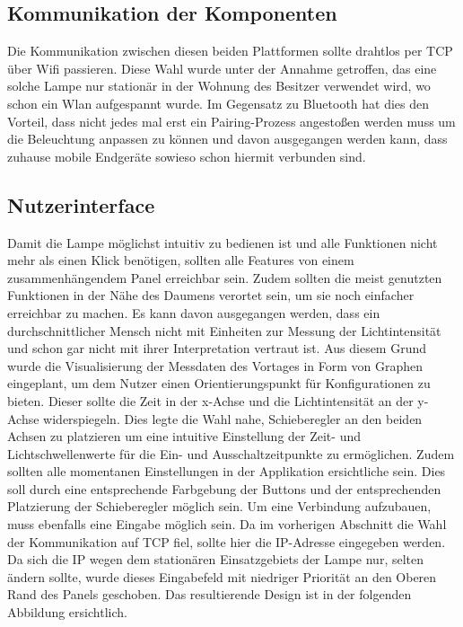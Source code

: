 \subsection{Kommunikation der Komponenten}
Die Kommunikation zwischen diesen beiden Plattformen sollte drahtlos per TCP über Wifi passieren. Diese Wahl wurde unter der Annahme getroffen, das eine solche Lampe nur stationär in der Wohnung des Besitzer verwendet wird, wo schon ein Wlan aufgespannt wurde. Im Gegensatz zu Bluetooth hat dies den Vorteil, dass nicht jedes mal erst ein Pairing-Prozess angestoßen werden muss um die Beleuchtung anpassen zu können und davon ausgegangen werden kann, dass zuhause mobile Endgeräte sowieso schon hiermit verbunden sind.

\subsection{Nutzerinterface}
Damit die Lampe möglichst intuitiv zu bedienen ist und alle Funktionen nicht mehr als einen Klick benötigen, sollten alle Features von einem zusammenhängendem Panel erreichbar sein. Zudem sollten die meist genutzten Funktionen in der Nähe des Daumens verortet sein, um sie noch einfacher erreichbar zu machen. Es kann davon ausgegangen werden, dass ein durchschnittlicher Mensch nicht mit Einheiten zur Messung der Lichtintensität und schon gar nicht mit ihrer Interpretation vertraut ist. Aus diesem Grund wurde die Visualisierung der Messdaten des Vortages in Form von Graphen eingeplant, um dem Nutzer einen Orientierungspunkt für Konfigurationen zu bieten. Dieser sollte die Zeit in der x-Achse und die Lichtintensität an der y-Achse widerspiegeln. Dies legte die Wahl nahe, Schieberegler an den beiden Achsen zu platzieren um eine intuitive Einstellung der Zeit- und Lichtschwellenwerte für die Ein- und Ausschaltzeitpunkte zu ermöglichen. Zudem sollten alle momentanen Einstellungen in der Applikation ersichtliche sein. Dies soll durch eine entsprechende Farbgebung der Buttons und der entsprechenden Platzierung der Schieberegler möglich sein. Um eine Verbindung aufzubauen, muss ebenfalls eine Eingabe möglich sein. Da im vorherigen Abschnitt die Wahl der Kommunikation auf TCP fiel, sollte hier die IP-Adresse eingegeben werden. Da sich die IP wegen dem stationären Einsatzgebiets der Lampe nur, selten ändern sollte, wurde dieses Eingabefeld mit niedriger Priorität an den Oberen Rand des Panels geschoben. Das resultierende Design ist in der folgenden Abbildung ersichtlich.

